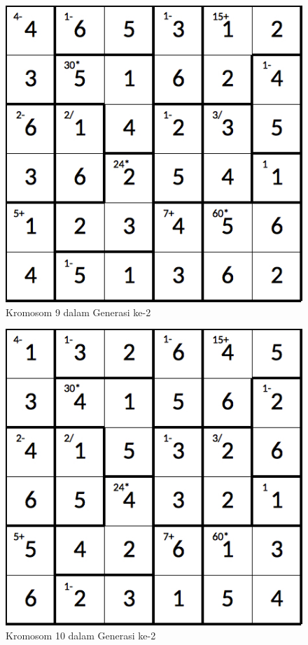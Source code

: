 \begin{figure}
\centering
\captionsetup{justification=centering}
\includegraphics[scale=0.333]{Gambar/hybridgenetic/Generation2Chromosome9}
\caption[Kromosom 9 dalam Generasi ke-2]{Kromosom 9 dalam Generasi ke-2}
\label{fig:analisisg2k9}
\end{figure}

\begin{figure}
\centering
\captionsetup{justification=centering}
\includegraphics[scale=0.333]{Gambar/hybridgenetic/Generation2Chromosome10}
\caption[Kromosom 10 dalam Generasi ke-2]{Kromosom 10 dalam Generasi ke-2}
\label{fig:analisisg2k10}
\end{figure}

